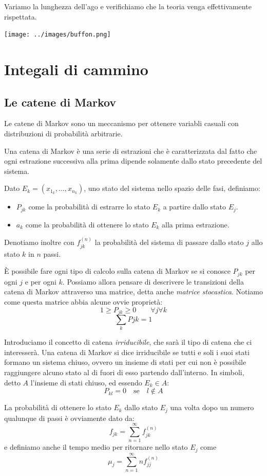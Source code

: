 \documentclass[a4paper,10pt]{article}
\begin{document}
Variamo la lunghezza dell'ago e verifichiamo che la teoria venga effettivamente rispettata.

\texttt{[image: ../images/buffon.png]}

\section{Integali di cammino}
\subsection{Le catene di Markov}

Le catene di Markov sono un meccanismo per ottenere variabli casuali con distribuzioni di probabilità arbitrarie.

Una catena di Markov è una serie di estrazioni che è caratterizzata dal fatto che ogni estrazione successiva alla prima dipende solamente dallo stato precedente del sistema.

Dato $E_k = (x_{1_k}, \dots, x_{n_k})$, uno stato del sistema nello spazio delle fasi, definiamo:
\begin{itemize}
 \item $P_{jk}$ come la probabilità di estrarre lo stato $E_k$ a partire dallo stato $E_j$.
 \item $a_k$ come la probabilità di ottenere lo stato $E_k$ alla prima estrazione.
\end{itemize}

Denotiamo inoltre con $f^{(n)}_{jk}$ la probabilità del sistema di passare dallo stato $j$ allo stato $k$ in $n$ passi.

È possibile fare ogni tipo di calcolo sulla catena di Markov se si conosce $P_{jk}$ per ogni $j$ e per ogni $k$. Possiamo allora pensare di descrivere le transizioni della catena di Markov attraverso una matrice, detta anche \emph{matrice stocastica}. Notiamo come questa matrice abbia alcune ovvie proprietà:
$$1\geq P_{jk} \geq 0\qquad \forall j \forall k$$
$$\sum_k Pjk = 1$$

Introduciamo il concetto di catena \emph{irriducibile}, che sarà il tipo di catena che ci interesserà. Una catena di Markov si dice irriducibile se tutti e soli i suoi stati formano un sistema chiuso, ovvero un insieme di stati per cui non è possibile raggiungere alcuno stato al di fuori di esso partendo dall'interno.
In simboli, detto $A$ l'insieme di stati chiuso, ed essendo $E_k\in A$:
$$P_{kl} = 0 \quad\text{se}\quad l\not\in A$$

La probabilità di ottenere lo stato $E_k$ dallo stato $E_j$ una volta dopo un numero qualunque di passi è ovviamente dato da:
$$f_{jk} = \sum_{n=1}^\infty f_{jk}^{(n)} $$
e definiamo anche il tempo medio per ritornare nello stato $E_j$ come
$$\mu_j = \sum_{n=1}^\infty n f_{jj}^{(n)}$$
\end{document}
